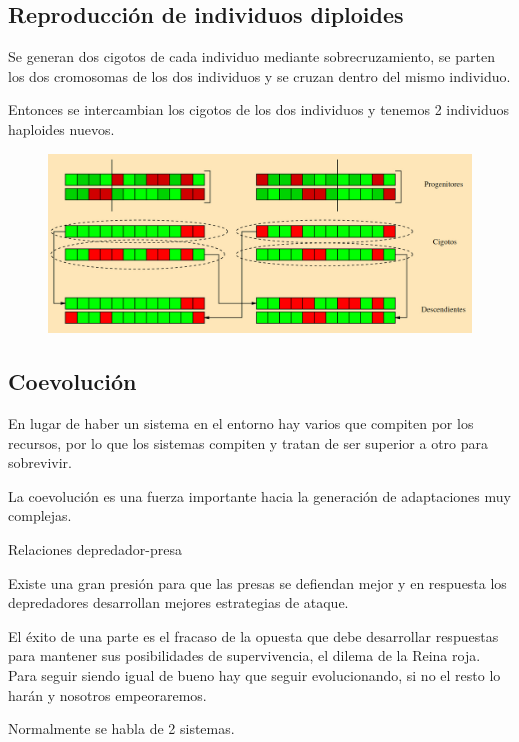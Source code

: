 \documentclass[12pt, twoside, openright]{report} %
\begin{document}
\subsection{Reproducción de individuos diploides}
Se generan dos cigotos de cada individuo mediante sobrecruzamiento, se parten los dos cromosomas de los dos individuos y se cruzan dentro del mismo individuo.

Entonces se intercambian los cigotos de los dos individuos y tenemos 2 individuos haploides nuevos.
\begin{figure}[H]
	{\includegraphics[scale=.4]{reproduccion_diploide.jpg}}
\end{figure}

\subsection{Coevolución}
En lugar de haber un sistema en el entorno hay varios que compiten por los recursos, por lo que los sistemas compiten y tratan de ser superior a otro para sobrevivir.

La coevolución es una fuerza importante hacia la generación de adaptaciones muy complejas.

Relaciones depredador-presa

Existe una gran presión para que las presas se defiendan mejor y en respuesta los depredadores desarrollan mejores estrategias de ataque.

El éxito de una parte es el fracaso de la opuesta que debe desarrollar respuestas para mantener sus posibilidades de supervivencia, el dilema de la Reina roja. Para seguir siendo igual de bueno hay que seguir evolucionando, si no el resto lo harán y nosotros empeoraremos.

Normalmente se habla de 2 sistemas.
\pagebreak
\end{document}
